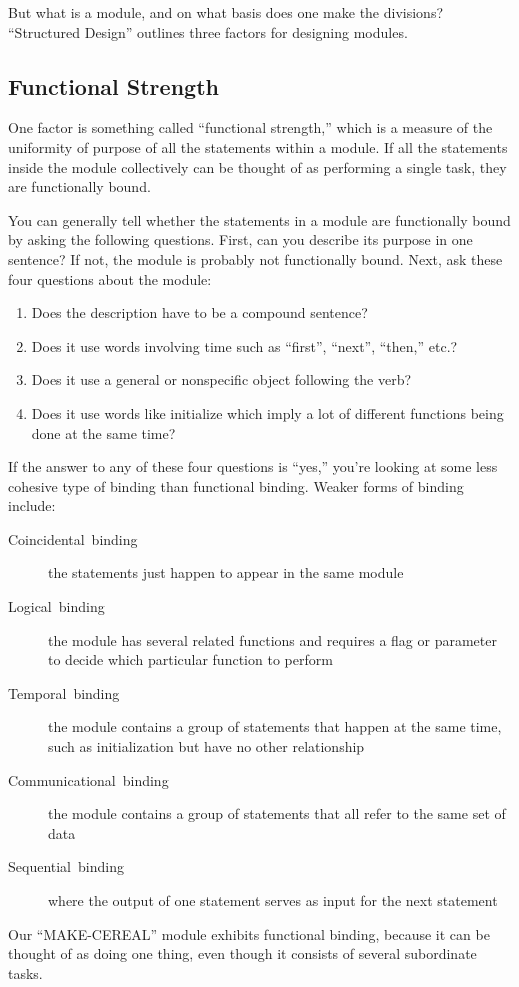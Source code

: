 But what is a module, and on what basis does one make the divisions?
{}``Structured Design'' outlines three factors for designing modules.


\subsection{Functional Strength}

One factor is something called {}``functional strength,'' which
is a measure of the uniformity of purpose of all the statements within
a module. If all the statements inside the module collectively can
be thought of as performing a single task, they are functionally bound.

You can generally tell whether the statements in a module are functionally
bound by asking the following questions. First, can you describe its
purpose in one sentence? If not, the module is probably not functionally
bound. Next, ask these four questions about the module:

\begin{enumerate}
\item Does the description have to be a compound sentence?
\item Does it use words involving time such as {}``first'', {}``next'',
{}``then,'' etc.?
\item Does it use a general or nonspecific object following the verb?
\item Does it use words like initialize which imply a lot of different functions
being done at the same time?
\end{enumerate}
If the answer to any of these four questions is {}``yes,'' you're
looking at some less cohesive type of binding than functional binding.
Weaker forms of binding include:

\begin{description}
\item [Coincidental~binding]the statements just happen to appear in the
same module
\item [Logical~binding]the module has several related functions and requires
a flag or parameter to decide which particular function to perform
\item [Temporal~binding]the module contains a group of statements that
happen at the same time, such as initialization but have no other
relationship
\item [Communicational~binding]the module contains a group of statements
that all refer to the same set of data
\item [Sequential~binding]where the output of one statement serves as
input for the next statement
\end{description}
Our {}``MAKE-CEREAL'' module exhibits functional binding, because
it can be thought of as doing one thing, even though it consists of
several subordinate tasks.


